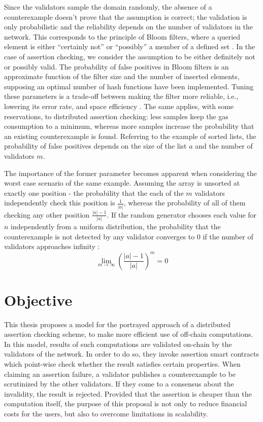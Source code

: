 Since the validators sample the domain randomly, the absence of a counterexample doesn't prove that the assumption is correct; the validation is only probabilistic and the reliability depends on the number of validators in the network. This corresponds to the principle of Bloom filters, where a queried element is either ``certainly not'' or ``possibly'' a member of a defined set \cite{blustein_bloom_2002}. In the case of assertion checking, we consider the assumption to be either definitely not or possibly valid. The probability of false positives in Bloom filters is an approximate function of the filter size and the number of inserted elements, supposing an optimal number of hash functions have been implemented. Tuning these parameters is a trade-off between making the filter more reliable, i.e., lowering its error rate, and space efficiency \cite{blustein_bloom_2002}. The same applies, with some reservations, to distributed assertion checking: less samples keep the gas consumption to a minimum, whereas more samples increase the probability that an existing counterexample is found. Referring to the example of sorted lists,  the probability of false positives depends on the size of the list $a$ and the number of validators $m$.

The importance of the former parameter becomes apparent when considering the worst case scenario of the same example. Assuming the array is unsorted at exactly one position - the probability that the each of the $m$ validators independently check this position is $\frac{1}{|a|}$, whereas the probability of all of them checking any other position $\frac{|a|-1}{|a|}$. If the random generator chooses each value for $n$ independently from a uniform distribution, the probability that the counterexample is not detected by any validator converges to 0 if the number of validators approaches infinity \cite{thiemann_2020}:
\begin{equation}\label{eq:limes_validators}
	\lim_{m\to\infty} \left(\frac{|a|-1}{|a|}\right)^m = 0
\end{equation}

\section{Objective}
This thesis proposes a model for the portrayed approach of a distributed assertion checking scheme, to make more efficient use of off-chain computations. In this model, results of such computations are validated on-chain by the validators of the network. In order to do so, they invoke assertion smart contracts which point-wise check whether the result satisfies certain properties. When claiming an assertion failure, a validator publishes a counterexample to be scrutinized by the other validators. If they come to a consensus about the invalidity, the result is rejected. Provided that the assertion is cheaper than the computation itself, the purpose of this proposal is not only to reduce financial costs for the users, but also to overcome limitations in scalability. 

